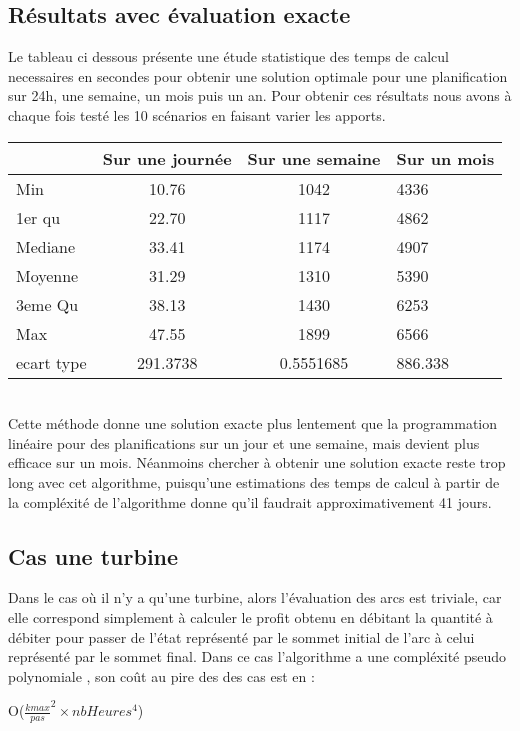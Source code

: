 \documentclass[a4paper]{report}
\begin{document}
\subsection{Résultats avec évaluation exacte}
Le tableau ci dessous présente une étude statistique des temps de calcul necessaires en secondes pour obtenir une solution optimale pour une planification sur 24h, une semaine, un mois puis un an. Pour obtenir ces résultats nous avons à chaque fois testé les 10 scénarios en faisant varier les apports.\\
\begin{tabular}{|l|c|c|l|}
  \hline
  &Sur une journée&Sur une semaine &Sur un mois\\
  \hline
  Min &10.76 &1042&4336\\
  \hline
  1er qu & 22.70 & 1117   &4862
\\
  \hline
  Mediane & 33.41&1174 &4907
\\
  \hline
  Moyenne &31.29 & 1310 &5390  

\\
  \hline
  3eme Qu &38.13&1430&6253\\
  \hline
  Max & 47.55 &1899&6566\\
\hline
 ecart type &291.3738 & 0.5551685 &886.338\\
 
  \hline
\end{tabular}
\\
Cette méthode donne une solution exacte plus lentement que la programmation linéaire pour des planifications sur un jour et une semaine, mais devient plus efficace sur un mois.  Néanmoins chercher à obtenir une solution exacte reste trop long avec cet algorithme, puisqu'une estimations des temps de calcul à partir de la compléxité de l'algorithme donne qu'il faudrait approximativement 41 jours.\\
\subsection{Cas une turbine}
Dans le cas où il n'y a qu'une turbine, alors l'évaluation des arcs est triviale, car elle correspond simplement à calculer le profit obtenu en débitant la quantité à débiter pour passer de l'état représenté par le sommet initial de l'arc  à celui représenté par le sommet final.
Dans ce cas l'algorithme a une compléxité pseudo polynomiale , son coût au pire des des cas est en :\\
\begin{center}
   O($\frac{kmax}{pas}^{2}\times nbHeures^{4}$)
\end{center}
\end{document}
